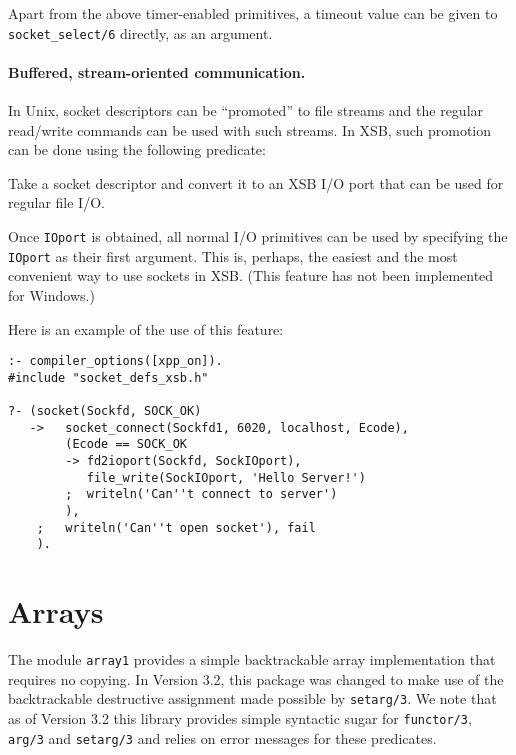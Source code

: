 \noindent
Apart from the above timer-enabled primitives, a timeout value can be given
to {\tt socket\_select/6} directly, as an argument.


\paragraph{Buffered, stream-oriented communication.}
In Unix, socket descriptors can be ``promoted'' to file streams and the
regular read/write commands can be used with such streams. In XSB, such
promotion can be done using the following predicate:
\begin{description}
 Take a
socket descriptor and convert it to an XSB I/O port that can be used
for regular file I/O.
\end{description}
Once {\tt IOport} is obtained, all normal I/O primitives can be used by
specifying the {\tt IOport} as their first argument. This is, perhaps, the
easiest and the most convenient way to use sockets in XSB. (This feature
has not been implemented for Windows.)

\noindent
Here is an example of the use of this feature:
\begin{samepage}
\begin{verbatim}
:- compiler_options([xpp_on]).
#include "socket_defs_xsb.h"

?- (socket(Sockfd, SOCK_OK)
   ->   socket_connect(Sockfd1, 6020, localhost, Ecode),
        (Ecode == SOCK_OK
        -> fd2ioport(Sockfd, SockIOport),
           file_write(SockIOport, 'Hello Server!')
        ;  writeln('Can''t connect to server')
        ),
    ;   writeln('Can''t open socket'), fail
    ).
\end{verbatim}
\end{samepage}


\section{Arrays}

The module {\tt array1} provides a simple backtrackable array
implementation that requires no copying.  In Version 3.2, this package
was changed to make use of the backtrackable destructive assignment
made possible by {\tt setarg/3}.  We note that as of Version 3.2 this
library provides simple syntactic sugar for {\tt functor/3}, {\tt
  arg/3} and {\tt setarg/3} and relies on error messages for these
predicates.

